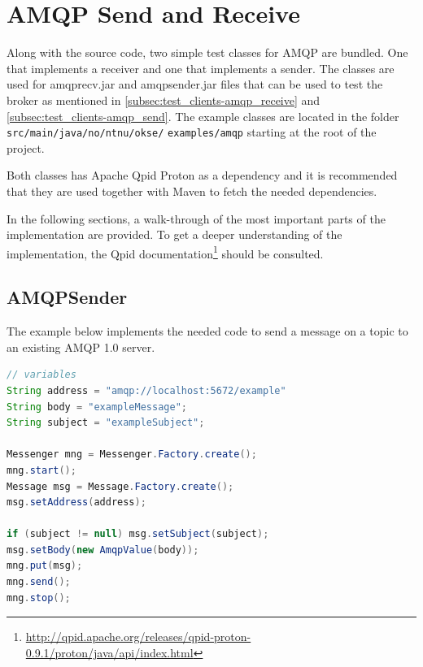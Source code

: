 \section{AMQP Send and Receive}
Along with the source code, two simple test classes for AMQP are bundled. One that implements a receiver and one that implements a sender. The classes are used for amqprecv.jar and amqpsender.jar files that can be used to test the broker as mentioned in \ref{subsec:test_clients-amqp_receive} and \ref{subsec:test_clients-amqp_send}. The example classes are located in the folder \verb!src/main/java/no/ntnu/okse/! \verb!examples/amqp! starting at the root of the project.

Both classes has Apache Qpid Proton as a dependency and it is recommended that they are used together with Maven to fetch the needed dependencies.

In the following sections, a walk-through of the most important parts of the implementation are provided. To get a deeper understanding of the implementation, the Qpid documentation\footnote{\url{http://qpid.apache.org/releases/qpid-proton-0.9.1/proton/java/api/index.html}} should be consulted.

\subsection{AMQPSender}
The example below implements the needed code to send a message on a topic to an existing AMQP 1.0 server.

\begin{lstlisting}[language=Java, captionpos=b, caption=Example use of Messenger to subscribe, frame=bt, showstringspaces=false,label={lst:AMQPSender}]
// variables
String address = "amqp://localhost:5672/example"
String body = "exampleMessage";
String subject = "exampleSubject";

Messenger mng = Messenger.Factory.create();
mng.start();
Message msg = Message.Factory.create();
msg.setAddress(address);

if (subject != null) msg.setSubject(subject);
msg.setBody(new AmqpValue(body));
mng.put(msg);
mng.send();
mng.stop();
\end{lstlisting}

